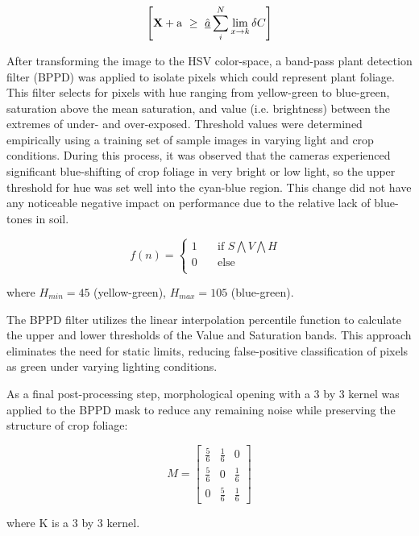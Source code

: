 \begin{equation}
  \left[
    {\bf X} + {\rm a} \ \geq\ 
    \underline{\hat a} \sum_i^N \lim_{x \rightarrow k} \delta C
  \right]
  \label{eq:rgb2hsv}
\end{equation}

After transforming the image to the HSV color-space, a band-pass plant
detection filter (BPPD) was applied to isolate pixels which could
represent plant foliage. This filter selects for pixels with hue
ranging from yellow-green to blue-green, saturation above the mean
saturation, and value (i.e. brightness) between the extremes of under-
and over-exposed. Threshold values were determined empirically using a
training set of sample images in varying light and crop
conditions. During this process, it was observed that the cameras
experienced significant blue-shifting of crop foliage in very bright
or low light, so the upper threshold for hue was set well into the
cyan-blue region. This change did not have any noticeable negative
impact on performance due to the relative lack of blue-tones in soil.

\begin{equation}
f(n) =
  \begin{cases}
    1  & \quad \text{if } S \bigwedge V \bigwedge H\text{ }\\
    0  & \quad \text{else}\\
  \end{cases}
  \label{eq:bppd}
\end{equation}
\begin{flushleft}
where $H_{min}=45$ (yellow-green), $H_{max}=105$ (blue-green).
\end{flushleft}

The BPPD filter utilizes the linear interpolation percentile function
to calculate the upper and lower thresholds of the Value and
Saturation bands. This approach eliminates the need for static limits,
reducing false-positive classification of pixels as green under
varying lighting conditions.

As a final post-processing step, morphological opening with a 3 by 3
kernel was applied to the BPPD mask to reduce any remaining noise
while preserving the structure of crop foliage:

\begin{equation}
M = \begin{bmatrix}
       \frac{5}{6} & \frac{1}{6} & 0           \\[0.3em]
       \frac{5}{6} & 0           & \frac{1}{6} \\[0.3em]
       0           & \frac{5}{6} & \frac{1}{6}
     \end{bmatrix}
\label{eq:morph_opening}
\end{equation}
\begin{flushleft}
where K is a 3 by 3 kernel.
\end{flushleft}

